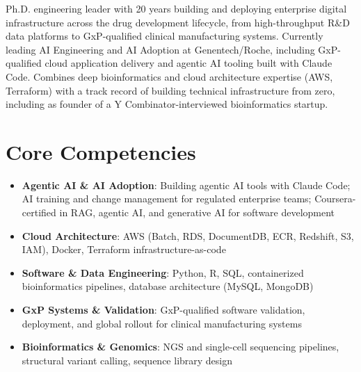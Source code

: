 \documentclass[11pt,a4paper,sans]{moderncv}
\begin{document}
\makecvtitle


\vspace{6pt}
\small{Ph.D. engineering leader with 20 years building and deploying enterprise digital infrastructure across the drug development lifecycle, from high-throughput R\&D data platforms to GxP-qualified clinical manufacturing systems. Currently leading AI Engineering and AI Adoption at Genentech/Roche, including GxP-qualified cloud application delivery and agentic AI tooling built with Claude Code. Combines deep bioinformatics and cloud architecture expertise (AWS, Terraform) with a track record of building technical infrastructure from zero, including as founder of a Y Combinator-interviewed bioinformatics startup.}


\section{Core Competencies}
\vspace{1pt}
\begin{itemize}

\item \textbf{Agentic AI \& AI Adoption}: Building agentic AI tools with Claude Code; AI training and change management for regulated enterprise teams; Coursera-certified in RAG, agentic AI, and generative AI for software development

\item \textbf{Cloud Architecture}: AWS (Batch, RDS, DocumentDB, ECR, Redshift, S3, IAM), Docker, Terraform infrastructure-as-code

\item \textbf{Software \& Data Engineering}: Python, R, SQL, containerized bioinformatics pipelines, database architecture (MySQL, MongoDB)

\item \textbf{GxP Systems \& Validation}: GxP-qualified software validation, deployment, and global rollout for clinical manufacturing systems

\item \textbf{Bioinformatics \& Genomics}: NGS and single-cell sequencing pipelines, structural variant calling, sequence library design

\end{itemize}
\end{document}
